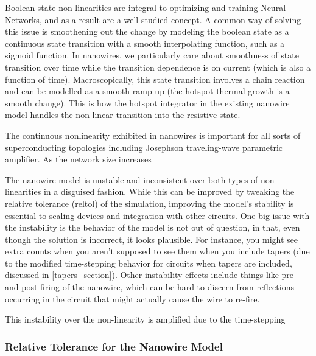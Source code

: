 \documentclass[]{article}
\newcommand{\todofig}[2][]{}
\newcommand{\todoidea}[2][]{}
\newcommand{\cf}[1]{\textsf{#1}}
\begin{document}
Boolean state non-linearities are integral to optimizing and training Neural Networks, and as a 
result are a well studied concept. A common way of solving this issue is smoothening out the 
change by modeling the boolean state as a continuous state transition with a smooth interpolating
function, such as a sigmoid function. In nanowires, we particularly care about smoothness of state
transition over time while the transition dependence is on current (which is also a function of time).
Macroscopically, this state transition involves a chain reaction and can be modelled as a smooth
ramp up (the hotspot thermal growth is a smooth change). This is how the hotspot integrator in the 
existing nanowire model handles the non-linear transition into the resistive state.

The continuous nonlinearity exhibited in nanowires is important for all sorts of superconducting topologies
including Josephson traveling-wave parametric amplifier. As the network size increases\todoidea[]{finish this}

The nanowire model is unstable and inconsistent over both types of non-linearities in a disguised 
fashion. While this can be improved by tweaking the relative tolerance (\cf{reltol}) 
of the simulation, improving the model's stability is essential to scaling devices and integration 
with other circuits.
One big issue with the instability is the behavior of the model is not out of question, in that,
even though the solution is incorrect, it looks plausible. For instance, you might see extra counts
when you aren't supposed to see them when you include tapers (due to the modified time-stepping behavior
for circuits when tapers are included, discussed in \ref{tapers_section}). Other instability effects
include things like pre- and post-firing of the nanowire, which can be hard to discern from reflections
occurring in the circuit that might actually cause the wire to re-fire.

This instability over the non-linearity is amplified due to the time-stepping 
\todoidea[]{continue}

\todofig[]{ref stability thru fig:sweepbias}

\todofig[]{analyze types of pre-firing post firing and misfiring}

\subsubsection{Relative Tolerance for the Nanowire Model} \label{reltol}
\end{document}
